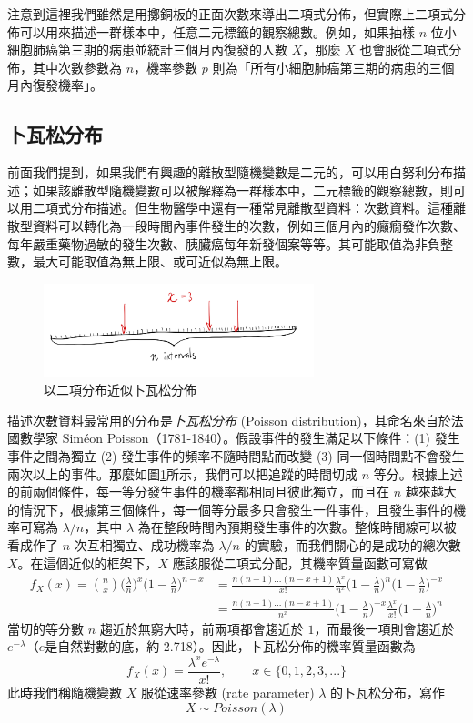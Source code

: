     注意到這裡我們雖然是用擲銅板的正面次數來導出二項式分佈，但實際上二項式分佈可以用來描述一群樣本中，任意二元標籤的觀察總數。例如，如果抽樣 $n$ 位小細胞肺癌第三期的病患並統計三個月內復發的人數 $X$，那麼 $X$ 也會服從二項式分佈，其中次數參數為 $n$，機率參數 $p$ 則為「所有小細胞肺癌第三期的病患的三個月內復發機率」。
    
\subsection{卜瓦松分布}
    前面我們提到，如果我們有興趣的離散型隨機變數是二元的，可以用白努利分布描述；如果該離散型隨機變數可以被解釋為一群樣本中，二元標籤的觀察總數，則可以用二項式分布描述。但生物醫學中還有一種常見離散型資料：次數資料。這種離散型資料可以轉化為一段時間內事件發生的次數，例如三個月內的癲癇發作次數、每年嚴重藥物過敏的發生次數、胰臟癌每年新發個案等等。其可能取值為非負整數，最大可能取值為無上限、或可近似為無上限。

    \begin{figure}[htbp]
        \centering
        \includegraphics[width=0.7\textwidth]{figures/03-Probability_distribution/Poisson_exp.jpeg}
        \caption{以二項分布近似卜瓦松分佈}
        \label{fig:poisson_exp}
    \end{figure}

    描述次數資料最常用的分布是\textit{卜瓦松分布} (Poisson distribution)，其命名來自於法國數學家 Siméon Poisson（1781-1840）。假設事件的發生滿足以下條件：(1) 發生事件之間為獨立 (2) 發生事件的頻率不隨時間點而改變 (3) 同一個時間點不會發生兩次以上的事件。那麼如圖\ref{fig:poisson_exp}所示，我們可以把追蹤的時間切成 $n$ 等分。根據上述的前兩個條件，每一等分發生事件的機率都相同且彼此獨立，而且在 $n$ 越來越大的情況下，根據第三個條件，每一個等分最多只會發生一件事件，且發生事件的機率可寫為 $\lambda/n$，其中 $\lambda$ 為在整段時間內預期發生事件的次數。整條時間線可以被看成作了 $n$ 次互相獨立、成功機率為 $\lambda/n$ 的實驗，而我們關心的是成功的總次數 $X$。在這個近似的框架下，$X$ 應該服從二項式分配，其機率質量函數可寫做
    \begin{align*}
        f_X(x) = \binom{n}{x} \Big(\frac{\lambda}{n}\Big)^x\Big(1-\frac{\lambda}{n}\Big)^{n-x} &= \frac{n (n-1)...(n-x+1)}{x!}\frac{\lambda^x}{n^x}\Big(1-\frac{\lambda}{n}\Big)^n\Big(1-\frac{\lambda}{n}\Big)^{-x}\\
        &= \frac{n (n-1)...(n-x+1)}{n^x} \Big(1-\frac{\lambda}{n}\Big)^{-x} \frac{\lambda^x}{x!} \Big(1-\frac{\lambda}{n}\Big)^n
    \end{align*}
    當切的等分數 $n$ 趨近於無窮大時，前兩項都會趨近於 $1$，而最後一項則會趨近於 $e^{-\lambda}$（$e$是自然對數的底，約 2.718）。因此，卜瓦松分佈的機率質量函數為
    \[f_X(x) = \frac{\lambda^x e^{-\lambda}}{x!}, \qquad x \in \{0,1,2,3,...\}\]
    此時我們稱隨機變數 $X$ 服從速率參數 (rate parameter) $\lambda$ 的卜瓦松分布，寫作
    \[X \sim Poisson(\lambda)\]

